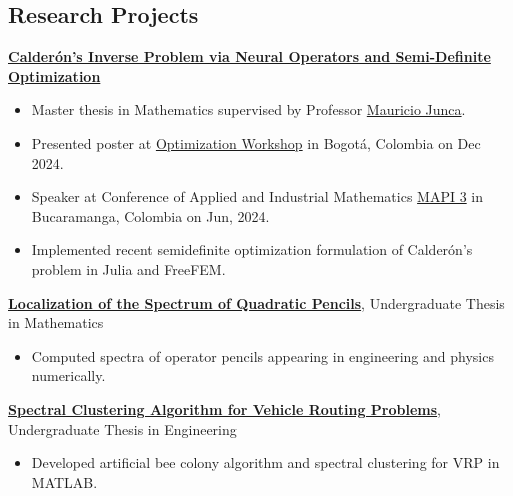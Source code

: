 \documentclass{article}
\begin{document}
\subsection*{Research Projects}
\textbf{\href{https://repositorio.uniandes.edu.co/server/api/core/bitstreams/d3a2a70b-554f-4d57-accb-289addc7d4e6/content}{Calder\'on's Inverse Problem via Neural Operators and Semi-Definite Optimization}}
\vspace{-0.3em}
\begin{itemize}
  \item {\small Master thesis in Mathematics supervised by Professor \href{https://math.uniandes.edu.co/~mjunca/}{Mauricio Junca}.}\vspace{-0.5em}
  \item {\small Presented poster at \href{https://optimization-workshop.github.io/}{\textcolor{myblue}{Optimization Workshop}} in Bogot\'a, Colombia on Dec 2024.} \vspace{-0.5em}
  \item {\small Speaker at Conference of Applied and Industrial Mathematics \href{https://scm.org.co/mapi-3/}{\textcolor{myblue}{MAPI 3}} in Bucaramanga, Colombia on Jun, 2024.}\vspace{-0.5em}
  \item {\small Implemented recent semidefinite optimization formulation of Calder\'on's problem in Julia and FreeFEM.}
\end{itemize}
\textbf{\href{https://repositorio.uniandes.edu.co/server/api/core/bitstreams/b6b169c8-b88e-451f-9f09-ea57bf1e4cb3/content}{Localization of the Spectrum of Quadratic Pencils}}, Undergraduate Thesis in Mathematics
\vspace{-0.3em}
\begin{itemize}
  \item {\small Computed spectra of operator pencils appearing in engineering and physics numerically.}
\end{itemize}
\textbf{\href{https://repositorio.uniandes.edu.co/server/api/core/bitstreams/801d284a-b76d-457f-8be0-38a3b5359259/content}{Spectral Clustering Algorithm for Vehicle Routing Problems}}, Undergraduate Thesis in Engineering
\vspace{-0.3em}
\begin{itemize}
  \item {\small Developed artificial bee colony algorithm and spectral clustering for VRP in MATLAB.}
\end{itemize}
\end{document}

